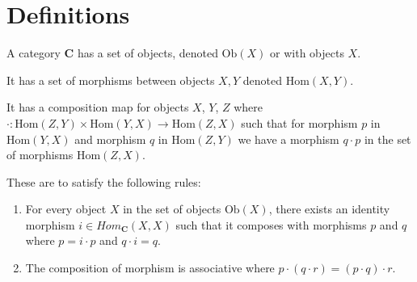 \section{Definitions}

\begin{definition}[Category]
	A category $\mathbf{C}$ has a set of objects, denoted $\mathrm{Ob}(X)$ or with objects $X$.
	
	It has a set of morphisms between objects $X, Y$ denoted $\mathrm{Hom}(X,Y)$. 
	
	It has a composition map for objects $X$, $Y$, $Z$ where $\cdot: \mathrm{Hom}(Z, Y) \times \mathrm{Hom}(Y,X) \rightarrow \mathrm{Hom}(Z, X)$ such that for morphism $p$ in $\mathrm{Hom}(Y,X)$ and morphism $q$ in $\mathrm{Hom}(Z, Y)$ we have a morphism $q \cdot p$ in the set of morphisms $\mathrm{Hom}(Z, X)$.

	These are to satisfy the following rules:

	\begin{enumerate}
		\item For every object $X$ in the set of objects $\mathrm{Ob}(X)$, there exists an identity morphism $i \in Hom_\mathbf{C}(X, X)$ such that it composes with morphisms $p$ and $q$ where $p = i \cdot p$ and $q \cdot i = q$.
		\item The composition of morphism is associative where $p \cdot ( q \cdot r) = (p \cdot q) \cdot r$.
	\end{enumerate}
\end{definition}